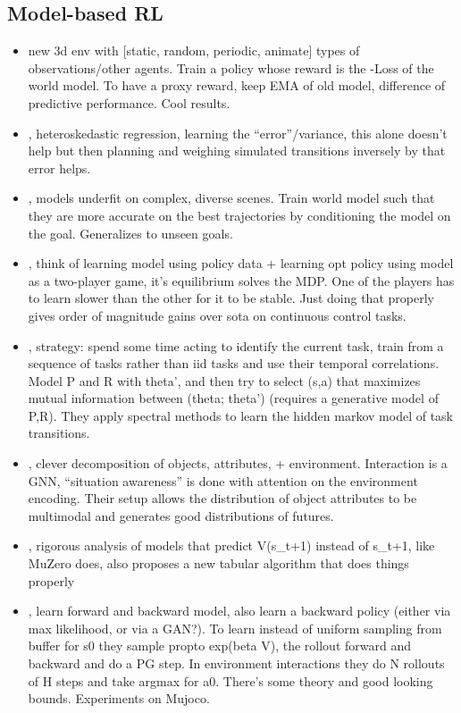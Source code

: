 \subsection{Model-based RL}
\begin{itemize}
\item \citet{kim2020active} new 3d env with [static, random, periodic, animate] types of observations/other agents. Train a policy whose reward is the -Loss of the world model. To have a proxy reward, keep EMA of old model, difference of predictive performance. Cool results. 
\item \citet{abbas2020selective}, heteroskedastic regression, learning the “error”/variance, this alone doesn’t help but then planning and weighing simulated transitions inversely by that error helps.
\item \citet{nair2020goal}, models underfit on complex, diverse scenes. Train world model such that they are more accurate on the best trajectories by conditioning the model on the goal. Generalizes to unseen goals. 
\item \citet{rajeswaran2020game}, think of learning model using policy data + learning opt policy using model as a two-player game, it’s equilibrium solves the MDP. One of the players has to learn slower than the other for it to be stable. Just doing that properly gives order of magnitude gains over sota on continuous control tasks. 
\item \citet{tirinzoni2020sequential}, strategy: spend some time acting to identify the current task, train from a sequence of tasks rather than iid tasks and use their temporal correlations. Model P and R with theta’, and then try to select (s,a) that maximizes mutual information between (theta; theta’) (requires a generative model of P,R). They apply spectral methods to learn the hidden markov model of task transitions.
\item \citet{lin2020improving}, clever decomposition of objects, attributes, + environment. Interaction is a GNN, “situation awareness” is done with attention on the environment encoding. Their setup allows the distribution of object attributes to be multimodal and generates good distributions of futures.
\item \citet{ayoub2020model}, rigorous analysis of models that predict V(s_t+1) instead of s_t+1, like MuZero does, also proposes a new tabular algorithm that does things properly
\item \citet{lai2020bidirectional}, learn forward and backward model, also learn a backward policy (either via max likelihood, or via a GAN?). To learn instead of uniform sampling from buffer for s0 they sample propto exp(beta V), the rollout forward and backward and do a PG step. In environment interactions they do N rollouts of H steps and take argmax for a0. There’s some theory and good looking bounds. Experiments on Mujoco.

\end{itemize}
